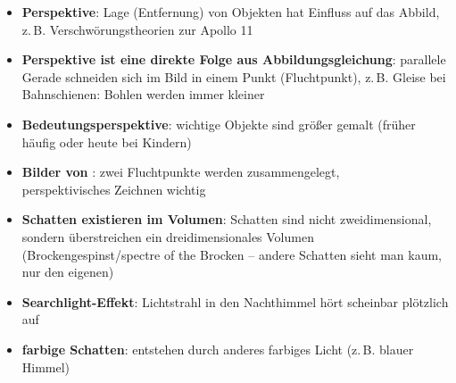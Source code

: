 \linie
\begin{itemize}
    \item
    \textbf{Perspektive}:
    Lage (Entfernung) von Objekten hat Einfluss auf das Abbild, z.\,B.
    Verschwörungstheorien zur Apollo 11

    \item
    \textbf{Perspektive ist eine direkte Folge aus Abbildungsgleichung}:
    parallele Gerade schneiden sich im Bild in einem Punkt (Fluchtpunkt),
    z.\,B. Gleise bei Bahnschienen: Bohlen werden immer kleiner

    \item
    \textbf{Bedeutungsperspektive}:
    wichtige Objekte sind größer gemalt (früher häufig oder heute bei Kindern)

    \item
    \textbf{Bilder von }: zwei Fluchtpunkte werden
    zusammengelegt, \\
    perspektivisches Zeichnen wichtig

    \item
    \textbf{Schatten existieren im Volumen}:
    Schatten sind nicht zweidimensional, sondern überstreichen
    ein dreidimensionales Volumen (Brockengespinst/spectre of the Brocken --
    andere Schatten sieht man kaum, nur den eigenen)

    \item
    \textbf{Searchlight-Effekt}:
    Lichtstrahl in den Nachthimmel hört scheinbar plötzlich auf

    \item
    \textbf{farbige Schatten}:
    entstehen durch anderes farbiges Licht (z.\,B. blauer Himmel)
\end{itemize}

\pagebreak
